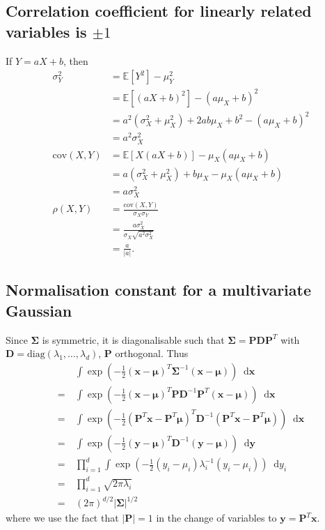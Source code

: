 \documentclass{article}
\newcommand*\diff{\mathop{}\!\mathrm{d}}
\begin{document}
\subsection{Correlation coefficient for linearly related variables is $\pm1$}
If $Y=aX+b$, then
\begin{align*}
\sigma_Y^2 &= \mathbb{E}[Y^2] - \mu_Y^2\\
&= \mathbb{E}[(aX+b)^2] - (a\mu_X+b)^2\\
&= a^2(\sigma_X^2+\mu_X^2) + 2ab\mu_X + b^2 - (a\mu_X+b)^2\\
&= a^2\sigma_X^2\\
\mathrm{cov}(X,Y) &= \mathbb{E}[X(aX+b)] - \mu_X(a\mu_X+b)\\
&= a(\sigma_X^2+\mu_X^2) + b\mu_X - \mu_X(a\mu_X+b)\\
&= a\sigma_X^2\\
\rho(X,Y) &= \frac{\mathrm{cov}(X,Y)}{\sigma_X\sigma_Y}\\
&= \frac{a\sigma_X^2}{\sigma_X\sqrt{a^2\sigma_X^2}}\\
&= \frac{a}{|a|}.
\end{align*}

\subsection{Normalisation constant for a multivariate Gaussian}
Since $\bm{\Sigma}$ is symmetric, it is diagonalisable such that $\bm{\Sigma} = \bm{P}\bm{D}\bm{P}^T$ with $\bm{D} = \mathrm{diag}(\lambda_1,\dots,\lambda_d)$, $\bm{P}$ orthogonal. Thus
\begin{align*}
&\int \exp(-\frac{1}{2} (\bm{x}-\bm{\mu})^T \bm{\Sigma}^{-1} (\bm{x}-\bm{\mu})) \diff\bm{x}\\
=\ &\int \exp(-\frac{1}{2} (\bm{x}-\bm{\mu})^T \bm{P}\bm{D}^{-1}\bm{P}^T (\bm{x}-\bm{\mu})) \diff\bm{x}\\
=\ &\int \exp(-\frac{1}{2} (\bm{P}^T\bm{x}-\bm{P}^T\bm{\mu})^T \bm{D}^{-1} (\bm{P}^T\bm{x}-\bm{P}^T\bm{\mu})) \diff\bm{x}\\
=\ &\int \exp(-\frac{1}{2} (\bm{y}-\bm{\mu})^T \bm{D}^{-1} (\bm{y}-\bm{\mu})) \diff\bm{y}\\
=\ &\prod_{i=1}^{d} \int \exp(-\frac{1}{2} (y_i-\mu_i)\lambda_i^{-1}(y_i-\mu_i)) \diff y_i\\
=\ &\prod_{i=1}^{d} \sqrt{2\pi\lambda_i}\\
=\ &(2\pi)^{d/2}|\bm\Sigma|^{1/2}
\end{align*}
where we use the fact that $|\bm{P}| = 1$ in the change of variables to $\bm{y} = \bm{P}^T\bm{x}$.
\end{document}
